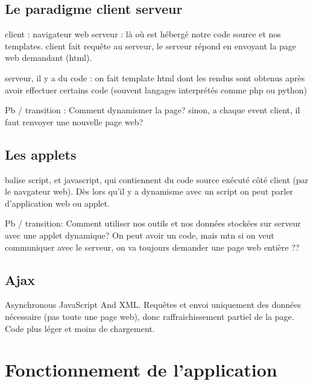 	\subsection{Le paradigme client serveur}
		client : navigateur web
		serveur : là où est hébergé notre code source et nos templates.
		client fait requête au serveur, le serveur répond en envoyant la page web demandant (html).
		
		serveur, il y a du code : on fait template html dont les rendus sont obtenus après avoir effectuer certains code (souvent langages interprétés comme php ou python)
		
		Pb / transition : Comment dynamismer la page? sinon, a chaque event client, il faut renvoyer une nouvelle page web?
	\subsection{Les applets}
		balise script, et javascript, qui contiennent du code source exécuté côté client (par le navgateur web).
		Dès lors qu'il y a dynamisme avec un script on peut parler d'application web ou applet.
		
		Pb / transition: Comment utiliser nos outils et nos données stockées sur serveur avec une applet dynamique? On peut avoir un code, mais mtn si on veut communiquer avec le serveur, on va toujours demander une page web entière ??
		
	\subsection{Ajax}
		Asynchronous JavaScript And XML. Requêtes et envoi uniquement des données nécessaire (pas toute une page web), donc raffraichissement partiel de la page. Code plus léger et moins de chargement.
		
	
	\section{Fonctionnement de l'application}
